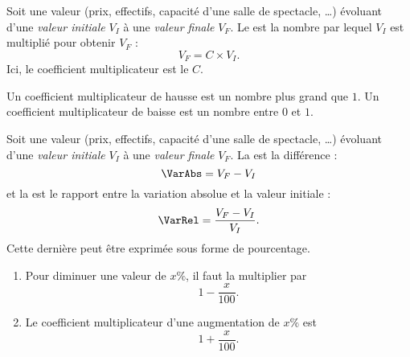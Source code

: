 \begin{definition}
    Soit une valeur (prix, effectifs, capacité d'une salle de spectacle, \ldots) évoluant d'une \emph{valeur initiale} \( V_I\) à une \emph{valeur finale} \( V_F\). Le  est la nombre par lequel \( V_I\) est multiplié pour obtenir \( V_F\) :
    \begin{equation}
        V_F=C\times V_I.
    \end{equation}
    Ici, le coefficient multiplicateur est le \( C\).
\end{definition}

Un coefficient multiplicateur de hausse est un nombre plus grand que \( 1\). Un coefficient multiplicateur de baisse est un nombre entre \( 0\) et \( 1\).

\begin{definition}
    Soit une valeur (prix, effectifs, capacité d'une salle de spectacle, \ldots) évoluant d'une \emph{valeur initiale} \( V_I\) à une \emph{valeur finale} \( V_F\). La  est la différence :
    \begin{equation}
        \VarAbs=V_F-V_I
    \end{equation}
    et la  est le rapport entre la variation absolue et la valeur initiale :
    \begin{equation}
        \VarRel=\frac{ V_F-V_I }{ V_I }.
    \end{equation}
    Cette dernière peut être exprimée sous forme de pourcentage.
\end{definition}

\begin{Aretenir}
    \begin{enumerate}
        \item
            Pour diminuer une valeur de \( x\%\), il faut la multiplier par 
            \begin{equation}
                1-\frac{ x }{ 100 }.
            \end{equation}
        \item
            Le coefficient multiplicateur d'une augmentation de \( x\%\) est
            \begin{equation}
                1+\frac{ x }{ 100 }.
            \end{equation}
    \end{enumerate}
\end{Aretenir}

